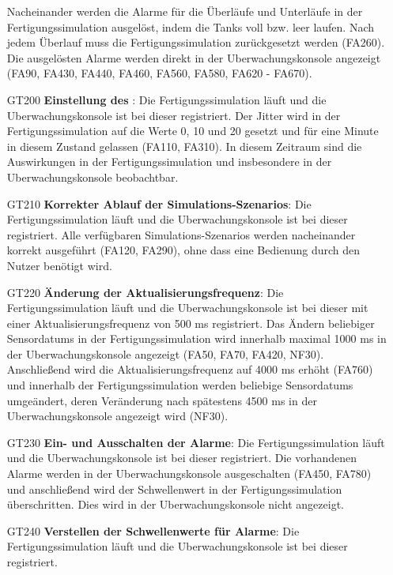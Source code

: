 \documentclass[parskip=full]{scrartcl}
\begin{document}
\begin{enumerate}
   Nacheinander werden die Alarme für die Überläufe und Unterläufe in der \gls{Fertigungssimulation} ausgelöst, indem die Tanks voll bzw. leer laufen. Nach jedem Überlauf muss die \gls{Fertigungssimulation} zurückgesetzt werden (FA260).
   Die ausgelösten Alarme werden direkt in der \gls{Uberwachungskonsole} angezeigt (FA90, FA430, FA440, FA460, FA560, FA580, FA620 - FA670).
  \item[GT200] \textbf{Einstellung des }: Die \gls{Fertigungssimulation} läuft und die \gls{Uberwachungskonsole} ist bei dieser registriert.
   Der \gls{Jitter} wird in der \gls{Fertigungssimulation} auf die Werte 0, 10 und 20 gesetzt und für eine Minute in diesem Zustand gelassen (FA110, FA310). In diesem Zeitraum sind die Auswirkungen
   in der \gls{Fertigungssimulation} und insbesondere in der \gls{Uberwachungskonsole} beobachtbar.
  \item[GT210] \textbf{Korrekter Ablauf der \glspl{Simulations-Szenario}}: Die \gls{Fertigungssimulation} läuft und die \gls{Uberwachungskonsole} ist bei dieser registriert.
   Alle verfügbaren \glspl{Simulations-Szenario} werden nacheinander korrekt ausgeführt (FA120, FA290), ohne dass eine Bedienung durch den Nutzer benötigt wird.
  \item[GT220] \textbf{Änderung der Aktualisierungsfrequenz}: Die \gls{Fertigungssimulation} läuft und die \gls{Uberwachungskonsole} ist bei dieser mit einer Aktualisierungsfrequenz von 500 ms
   registriert. Das Ändern beliebiger \glspl{Sensordatum} in der \gls{Fertigungssimulation} wird innerhalb maximal 1000 ms in der \gls{Uberwachungskonsole} angezeigt (FA50, FA70, FA420, NF30).
   Anschließend wird die Aktualisierungsfrequenz auf 4000 ms erhöht (FA760) und innerhalb der \gls{Fertigungssimulation} werden beliebige \glspl{Sensordatum} umgeändert, deren
   Veränderung nach spätestens 4500 ms in der \gls{Uberwachungskonsole} angezeigt wird (NF30).
  \item[GT230] \textbf{Ein- und Ausschalten der Alarme}: Die \gls{Fertigungssimulation} läuft und die \gls{Uberwachungskonsole} ist bei dieser registriert.
   Die vorhandenen Alarme werden in der \gls{Uberwachungskonsole} ausgeschalten (FA450, FA780) und anschließend wird der Schwellenwert in der \gls{Fertigungssimulation} überschritten.
   Dies wird in der \gls{Uberwachungskonsole} nicht angezeigt.
  \item[GT240] \textbf{Verstellen der Schwellenwerte für Alarme}: Die \gls{Fertigungssimulation} läuft und die \gls{Uberwachungskonsole} ist bei dieser registriert.

\end{enumerate}
\end{document}
